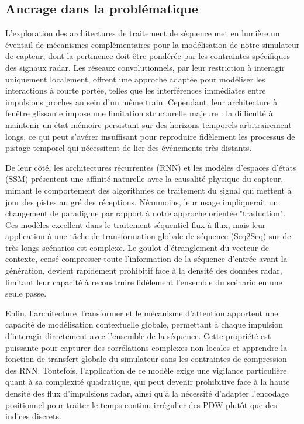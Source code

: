 \subsection{Ancrage dans la problématique}
\label{seq:discRNN}
L'exploration des architectures de traitement de séquence met en lumière un éventail de mécanismes complémentaires pour la modélisation de notre simulateur de capteur, dont la pertinence doit être pondérée par les contraintes spécifiques des signaux radar. Les réseaux convolutionnels, par leur restriction à interagir uniquement localement, offrent une approche adaptée pour modéliser les interactions à courte portée, telles que les interférences immédiates entre impulsions proches au sein d'un même train. Cependant, leur architecture à fenêtre glissante impose une limitation structurelle majeure : la difficulté à maintenir un état mémoire persistant sur des horizons temporels arbitrairement longs, ce qui peut s'avérer insuffisant pour reproduire fidèlement les processus de pistage temporel qui nécessitent de lier des événements très distants.

De leur côté, les architectures récurrentes (RNN) et les modèles d'espaces d'états (SSM) présentent une affinité naturelle avec la causalité physique du capteur, mimant le comportement des algorithmes de traitement du signal qui mettent à jour des pistes au gré des réceptions. Néanmoins, leur usage impliquerait un changement de paradigme par rapport à notre approche orientée "traduction". Ces modèles excellent dans le traitement séquentiel flux à flux, mais leur application à une tâche de transformation globale de séquence (Seq2Seq) sur de très longs scénarios est complexe. Le goulot d'étranglement du vecteur de contexte, censé compresser toute l'information de la séquence d'entrée avant la génération, devient rapidement prohibitif face à la densité des données radar, limitant leur capacité à reconstruire fidèlement l'ensemble du scénario en une seule passe.

Enfin, l'architecture Transformer et le mécanisme d'attention apportent une capacité de modélisation contextuelle globale, permettant à chaque impulsion d'interagir directement avec l'ensemble de la séquence. Cette propriété est puissante pour capturer des corrélations complexes non-locales et apprendre la fonction de transfert globale du simulateur sans les contraintes de compression des RNN. Toutefois, l'application de ce modèle exige une vigilance particulière quant à sa complexité quadratique, qui peut devenir prohibitive face à la haute densité des flux d'impulsions radar, ainsi qu'à la nécessité d'adapter l'encodage positionnel pour traiter le temps continu irrégulier des PDW plutôt que des indices discrets.
